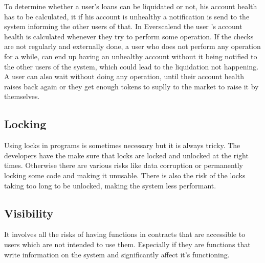 To determine whether a user's loans can be liquidated or not, his account health has to be calculated, it if his account is unhealthy a notification is send to the system informing the other users of that. In Everscalend the user 's account health is calculated whenever they try to perform some operation. If the checks are not regularly and externally done, a user who does not perform any operation for a while, can end up having an unhealthy account without it being notified to the other users of the system, which could lead to the liquidation not happening. A user can also wait without doing any operation, until their account health raises back again or they get enough tokens to suplly to the market to raise it by themselves.

\subsection{Locking} %

Using locks in programs is sometimes necessary but it is always tricky. The developers have the make sure that locks are locked and unlocked at the right times. Otherwise there are various risks like data corruption or permanently locking some code and making it unusable. There is also the risk of the locks taking too long to be unlocked, making the system less performant.



\subsection{Visibility} %

It involves all the risks of having functions in contracts that are accessible to users which are not intended to use them. Especially if they are functions that write information on the system and significantly affect it's functioning.
